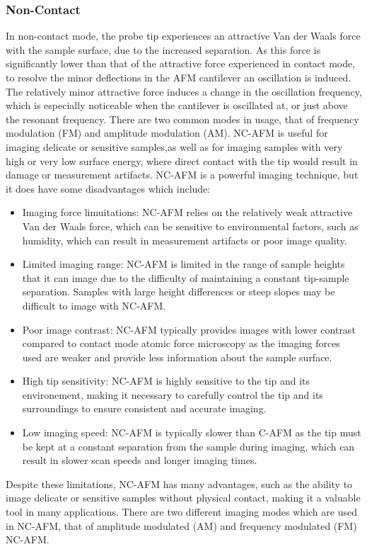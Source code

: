 \subsubsection{Non-Contact}
In non-contact mode, the probe tip experiences an attractive Van der Waals force with the sample surface, due to the increased separation. As this force is significantly lower than that of the attractive force experienced in contact mode, to resolve the minor deflections in the AFM cantilever an oscillation is induced. The relatively minor attractive force induces a change in the oscillation frequency, which is especially noticeable when the cantilever is oscillated at, or just above the resonant frequency. There are two common modes in usage, that of frequency modulation (FM) and amplitude modulation (AM). NC-AFM is useful for imaging delicate or sensitive samples,as well as for imaging samples with very high or very low surface energy, where direct contact with the tip would result in damage or measurement artifacts. NC-AFM is a powerful imaging technique, but it does have some disadvantages which include:
\begin{itemize}
    \item Imaging force limuitations: NC-AFM relies on the relatively weak attractive Van der Waals force, which can be sensitive to environmental factors, such as humidity, which can result in measurement artifacts or poor image quality.
    \item Limited imaging range: NC-AFM is limited in the range of sample heights that it can image due to the difficulty of maintaining a constant tip-sample separation. Samples with large height differences or steep slopes may be difficult to image with NC-AFM.
    \item Poor image contrast: NC-AFM typically provides images with lower contrast compared to contact mode atomic force microscopy as the imaging forces used are weaker and provide less information about the sample surface.
    \item High tip sensitivity: NC-AFM is highly sensitive to the tip and its environement, making it necessary to carefully control the tip and its surroundings to ensure consistent and accurate imaging.
    \item Low imaging speed: NC-AFM is typically slower than C-AFM as the tip must be kept at a constant separation from the sample during imaging, which can result in slower scan speeds and longer imaging times.
\end{itemize}
Despite these limitations, NC-AFM has many advantages, such as the ability to image delicate or sensitive samples without physical contact, making it a valuable tool in many applications. There are two different imaging modes which are used in NC-AFM, that of amplitude modulated (AM) and frequency modulated (FM) NC-AFM.
